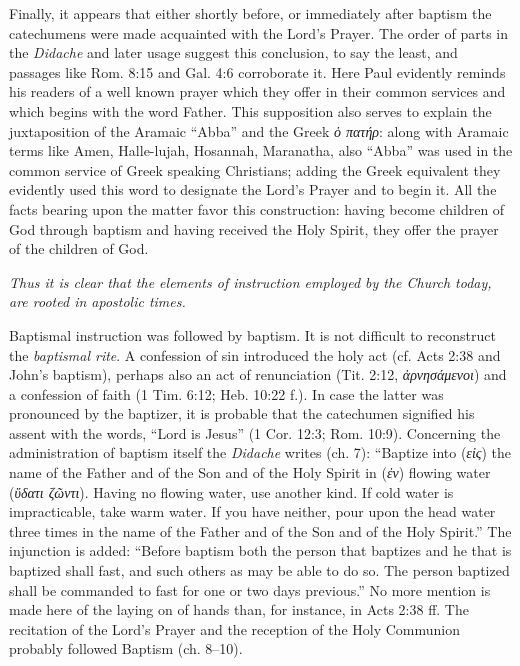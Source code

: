 Finally, it appears that either shortly before, or immediately after baptism the catechumens were made acquainted with the Lord’s Prayer. The order of parts in the \emph{Didache}
and later usage suggest this conclusion, to say the least, and passages like Rom. 8:15 and Gal. 4:6 corroborate it. Here Paul evidently reminds his readers of a well known prayer which they offer in their common services and which begins with the word Father. This supposition also serves to explain the juxtaposition of the Aramaic “Abba” and the Greek \emph{ὁ πατήρ}: along with Aramaic terms like Amen, Halle-lujah, Hosannah, Maranatha, also “Abba” was used in the common service of Greek speaking Christians; adding the Greek equivalent they evidently used this word to designate the Lord’s Prayer and to begin it. All the facts bearing upon the matter favor this construction: having become children of God through baptism and having received the Holy Spirit, they offer the prayer of the children of God.

\emph{Thus it is clear that the elements of instruction employed by the Church today, are rooted in apostolic times.}

Baptismal instruction was followed by baptism. It is not difficult to reconstruct the \emph{baptismal rite}. A confession of sin introduced the holy act (cf. Acts 2:38 and John’s baptism), perhaps also an act of renunciation (Tit. 2:12, \emph{ἀρνησάμενοι}) and a confession of faith (1 Tim. 6:12; Heb. 10:22 f.). In case the latter was pronounced by the baptizer, it is probable that the catechumen signified his assent with the words, “Lord is Jesus” (1 Cor. 12:3; Rom. 10:9). Concerning the administration of baptism itself the \emph{Didache} writes (ch. 7): “Baptize into (\emph{εἰς}) the name of the Father and of the Son and of the Holy Spirit in (\emph{ἐν}) flowing water (\emph{ὕδατι ζῶντι}). Having no flowing water, use another kind. If cold water is impracticable, take warm water. If you have neither, pour upon the head water three times in the name of the Father and of the Son and of the Holy Spirit.” The injunction is added: “Before baptism both the person that baptizes and he that is baptized shall fast, and such others as may be able to do so. The person baptized shall
be commanded to fast for one or two days previous.” No more mention is made here of the laying on of hands than, for instance, in Acts 2:38 ff. The recitation of the Lord’s Prayer and the reception of the Holy Communion probably followed Baptism (ch. 8–10).

